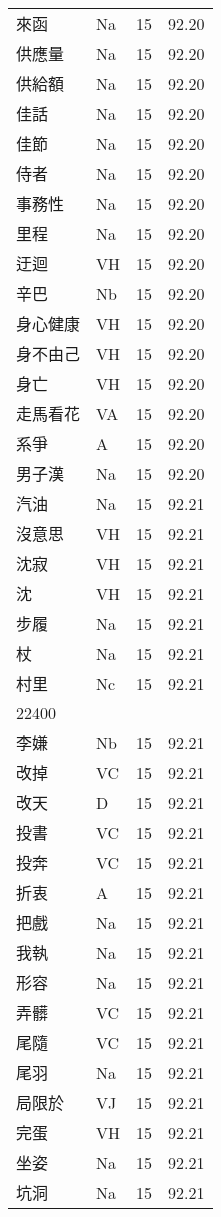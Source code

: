 \documentclass[twocolumn]{book}
\begin{document}
\begin{supertabular}{llrr}
來函 & Na & 15 &  92.20\\
供應量 & Na & 15 &  92.20\\
供給額 & Na & 15 &  92.20\\
佳話 & Na & 15 &  92.20\\
佳節 & Na & 15 &  92.20\\
侍者 & Na & 15 &  92.20\\
事務性 & Na & 15 &  92.20\\
里程 & Na & 15 &  92.20\\
迂迴 & VH & 15 &  92.20\\
辛巴 & Nb & 15 &  92.20\\
身心健康 & VH & 15 &  92.20\\
身不由己 & VH & 15 &  92.20\\
身亡 & VH & 15 &  92.20\\
走馬看花 & VA & 15 &  92.20\\
系爭 & A & 15 &  92.20\\
男子漢 & Na & 15 &  92.20\\
汽油 & Na & 15 &  92.21\\
沒意思 & VH & 15 &  92.21\\
沈寂 & VH & 15 &  92.21\\
沈 & VH & 15 &  92.21\\
步履 & Na & 15 &  92.21\\
杖 & Na & 15 &  92.21\\
村里 & Nc & 15 &  92.21\\
22400\\
李嫌 & Nb & 15 &  92.21\\
改掉 & VC & 15 &  92.21\\
改天 & D & 15 &  92.21\\
投書 & VC & 15 &  92.21\\
投奔 & VC & 15 &  92.21\\
折衷 & A & 15 &  92.21\\
把戲 & Na & 15 &  92.21\\
我執 & Na & 15 &  92.21\\
形容 & Na & 15 &  92.21\\
弄髒 & VC & 15 &  92.21\\
尾隨 & VC & 15 &  92.21\\
尾羽 & Na & 15 &  92.21\\
局限於 & VJ & 15 &  92.21\\
完蛋 & VH & 15 &  92.21\\
坐姿 & Na & 15 &  92.21\\
坑洞 & Na & 15 &  92.21\\

\end{supertabular}
\end{document}

